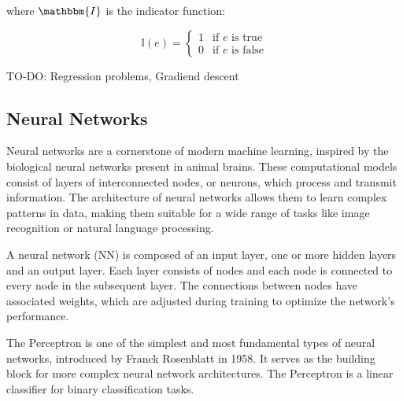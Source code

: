 \documentclass[11pt,english,listoffigures,listoftables]{tfgetsinf}
\begin{document}
where \( \mathbbm{I} \) is the indicator function:

\begin{equation}
\mathbb{I}(e) = 
\begin{cases} 
1 & \text{if } e \text{ is true} \\ 
0 & \text{if } e \text{ is false} 
\end{cases}
\end{equation}

TO-DO: Regression problems, Gradiend descent

\subsection{Neural Networks}

Neural networks are a cornerstone of modern machine learning, inspired by the biological neural networks present in animal brains. These computational models consist of layers of interconnected nodes, or neurons, which process and transmit information. The architecture of neural networks allows them to learn complex patterns in data, making them suitable for a wide range of tasks like image recognition or natural language processing.

A neural network (NN) is composed of an input layer, one or more hidden layers and an output layer. Each layer consists of nodes and each node is connected to every node in the subsequent layer. The connections between nodes have associated weights, which are adjusted during training to optimize the network's performance.

The Perceptron is one of the simplest and most fundamental types of neural networks, introduced by Franck Rosenblatt in 1958. It serves as the building block for more complex neural network architectures. The Perceptron is a linear classifier for binary classification tasks.
\end{document}
